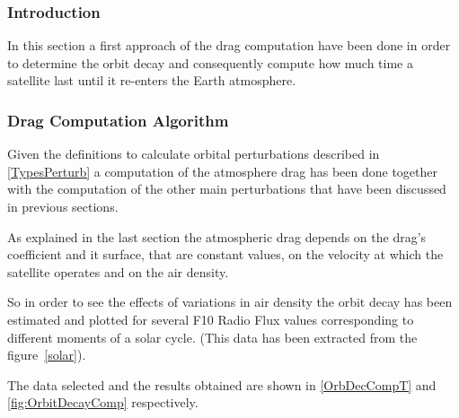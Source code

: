 \subsubsection{Introduction}

In this section a first approach of the drag computation have been done in order to determine the orbit decay and consequently compute how much time a satellite last until it re-enters the Earth atmosphere.

\subsubsection{Drag Computation Algorithm}

Given the definitions to calculate orbital perturbations described in \ref{TypesPerturb} a computation of the atmosphere drag has been done together with the computation of the other main perturbations that have been discussed in previous sections.

As explained in the last section the atmospheric drag depends on the drag's coefficient and it surface, that are constant values, on the velocity at which the satellite operates and on the air density.

So in order to see the effects of variations in air density the orbit decay has been estimated and plotted for several F10 Radio Flux values corresponding to different moments of a solar cycle. (This data has been extracted from the figure~\ref{solar}).

The data selected and the results obtained are shown in \ref{OrbDecCompT} and \ref{fig:OrbitDecayComp} respectively.



